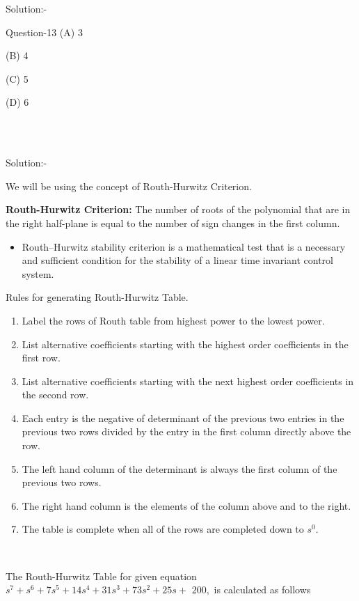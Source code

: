 \documentclass[journal,12pt,twocolumn]{IEEEtran}
\begin{document}
\begin{frame}{Solution:- }
\begin{frame}{Question-13 }
(A) 3

(B) 4

(C) 5

(D) 6
\end{frame}
\\\\
\begin{frame}{Solution:- }

We will be using the concept of Routh-Hurwitz Criterion.

\textbf{Routh-Hurwitz Criterion:} The number of roots of the polynomial that are in the right half-plane is equal to
the number of sign changes in the first column.

\begin{itemize}
\item Routh–Hurwitz stability criterion is a mathematical test that is a necessary and sufficient condition for the stability of a linear time invariant control system.
\end{itemize}
\end{frame}


\begin{frame}{}

Rules for generating Routh-Hurwitz Table.

\begin{enumerate}
    \item Label the rows of Routh table from highest power to the lowest power.
    \item List alternative coefficients starting with the highest order coefficients in the first row.
    \item List alternative coefficients starting with the next highest order coefficients in the second row.
    \item Each entry is the negative of determinant of the previous two entries in the previous two rows divided by the entry in the first column directly above the row.
    \item The left hand column of the determinant is always the first column of the previous two rows.
    \item The right hand column is the elements of the column above and to the right.
    \item The table is complete when all of the rows are completed down to $s^0$.
\end{enumerate}
\end{frame}
\\
\begin{frame}{}
The Routh-Hurwitz Table for given equation $s^{7}+s^{6}+7 s^{5}+14 s^{4}+31s^{3}+73 s^{2}+25 s+$ $200,$ is calculated as follows


\end{frame}
\end{frame}
\end{document}
